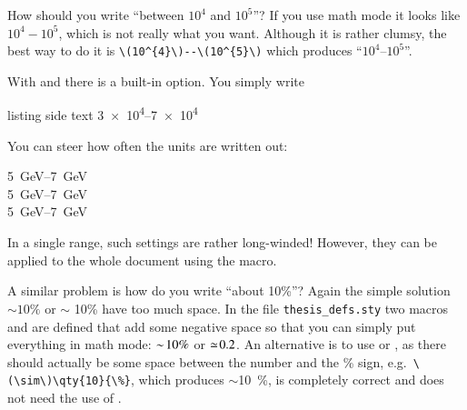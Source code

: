 How should you write \enquote{between \(10^{4}\) and \(10^{5}\)}?
If you use math mode it looks like \(10^{4} - 10^{5}\), which is not
really what you want.
Although it is rather clumsy, the best way to do
it is \verb+\(10^{4}\)--\(10^{5}\)+ which produces
\enquote{\(10^{4}\)--\(10^{5}\)}.

With  and  there is a built-in option.
You simply write
\begin{tcblisting}{listing side text}
\numrange{3e4}{7e4}
\end{tcblisting}
You can steer how often the units are written out:
\begin{tcblisting}{}
\qtyrange[range-units=repeat, range-phrase=--]{5}{7}{\GeV}\\
\qtyrange[range-units=single, range-phrase=--]{5}{7}{\GeV}\\
\qtyrange[range-units=brackets, range-phrase=--]{5}{7}{\GeV}
\end{tcblisting}
In a single range, such settings are rather long-winded!
However, they can be applied to the whole
document using the  macro.

A similar problem is how do you write \enquote{about 10\%}?  Again the
simple solution \(\sim 10\%\) or \(\sim\) 10\% have too much space. In the
file \texttt{thesis\_defs.sty} two macros  and
 are defined that add some negative space so that you
can simply put everything in math mode: \(\sim\! 10\%\) or \(\simeq\! 0.2\).
An alternative is to use  or , as there
should actually be some space between the number and the \% sign,
e.g.\ \verb+\(\sim\)\qty{10}{\%}+, which produces \(\sim\)\qty{10}{\%}, is
completely correct and does not need the use of .

